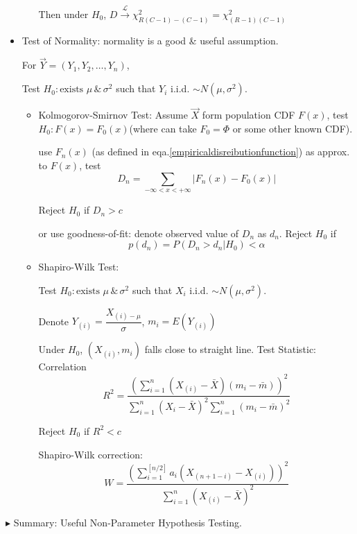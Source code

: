 \documentclass[11pt,a4paper]{ctexart}
\numberwithin{equation}{section}%
\newenvironment{point}{\raggedright$\blacktriangleright$}{}%
\begin{document}
\begin{itemize}
\begin{itemize}
    Then under $H_0$, $D\xrightarrow[]{\mathscr{L}}\chi^2_{R(C-1)-(C-1)}=\chi^2_{(R-1)(C-1)}$
    \end{itemize}

    \item Test of Normality: normality is a good \& useful assumption.
    
    For $\vec{Y}=(Y_1,Y_2,\ldots,Y_n)$,

    Test $H_0:\text{exists }\mu\,\&\, \sigma^2$ such that $Y_i$ i.i.d. $\sim N(\mu,\sigma^2)$.

    \begin{itemize}
        \item Kolmogorov-Smirnov Test: Assume $\vec{X}$ form population CDF $F(x)$, test $H_0:F(x)=F_0(x)$(where can take $F_0=\Phi$ or some other known CDF).
        
        use $F_n(x)$ (as defined in eqa.\ref{empiricaldisreibutionfunction}) as approx. to $F(x)$, test
        \[
            D_n=\sum_{-\infty< x<+\infty}|F_n(x)-F_0(x)|
        \]

        Reject $H_0$ if $D_n>c$

        or use goodness-of-fit: denote observed value of $D_n$ as $d_n$. Reject $H_0$ if
        \[
            p(d_n)=P(D_n>d_n|H_0)<\alpha
        \]

        \item Shapiro-Wilk Test:
        
        Test $H_0:\text{exists }\mu\,\&\, \sigma^2$ such that $X_i$ i.i.d. $\sim N(\mu,\sigma^2)$.

        Denote $Y_{(i)}=\dfrac{X_{(i)-\mu}}{\sigma}$, $m_i=E(Y_{(i)})$

        Under $H_0$, $(X_{(i)},m_i)$ falls close to straight line. Test Statistic: Correlation
        \[
            R^2=\dfrac{\left(\sum_{i=1}^n(X_{(i)}-\bar{X})(m_i-\bar{m})\right)^2}{\sum_{i=1}^n(X_{i}-\bar{X})^2\sum_{i=1}^n(m_i-\bar{m})^2}
        \]

        Reject $H_0$ if $R^2<c$

        Shapiro-Wilk correction:
        \[
            W=\dfrac{\left(\sum_{i=1}^{[n/2]}a_i(X_{(n+1-i)}-X_{(i)})\right)^2}{\sum_{i=1}^n(X_{(i)}-\bar{X})^2}
        \]
    \end{itemize}
\end{itemize}

\begin{point}
    Summary: Useful Non-Parameter Hypothesis Testing.
\end{point}
\\
\\
\end{document}
